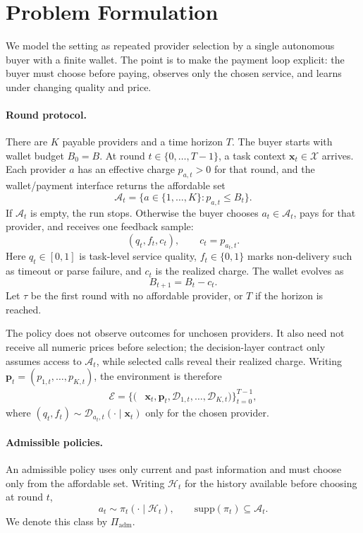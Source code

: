 \section{Problem Formulation}
\label{sec:problem}

We model the setting as repeated provider selection by a single autonomous buyer with a finite wallet. The point is to make the payment loop explicit: the buyer must choose before paying, observes only the chosen service, and learns under changing quality and price.

\paragraph{Round protocol.}
There are $K$ payable providers and a time horizon $T$. The buyer starts with wallet budget $B_0=B$. At round $t\in\{0,\ldots,T-1\}$, a task context $\mathbf{x}_t\in\mathcal{X}$ arrives. Each provider $a$ has an effective charge $p_{a,t}>0$ for that round, and the wallet/payment interface returns the affordable set
\begin{equation}
\label{eq:affordable-set}
\mathcal{A}_t=\{a\in\{1,\ldots,K\}:p_{a,t}\le B_t\}.
\end{equation}
If $\mathcal{A}_t$ is empty, the run stops. Otherwise the buyer chooses $a_t\in\mathcal{A}_t$, pays for that provider, and receives one feedback sample:
\[
(q_t,f_t,c_t),\qquad c_t=p_{a_t,t}.
\]
Here $q_t\in[0,1]$ is task-level service quality, $f_t\in\{0,1\}$ marks non-delivery such as timeout or parse failure, and $c_t$ is the realized charge. The wallet evolves as
\begin{equation}
\label{eq:wallet}
B_{t+1}=B_t-c_t .
\end{equation}
Let $\tau$ be the first round with no affordable provider, or $T$ if the horizon is reached.

The policy does not observe outcomes for unchosen providers. It also need not receive all numeric prices before selection; the decision-layer contract only assumes access to $\mathcal{A}_t$, while selected calls reveal their realized charge. Writing $\mathbf{p}_t=(p_{1,t},\ldots,p_{K,t})$, the environment is therefore
\[
\begin{aligned}
\mathcal{E}=\{(&\mathbf{x}_t,\mathbf{p}_t,
\mathcal{D}_{1,t},\ldots,\mathcal{D}_{K,t})\}_{t=0}^{T-1},
\end{aligned}
\]
where $(q_t,f_t)\sim\mathcal{D}_{a_t,t}(\cdot\mid\mathbf{x}_t)$ only for the chosen provider.

\paragraph{Admissible policies.}
An admissible policy uses only current and past information and must choose only from the affordable set. Writing $\mathcal{H}_t$ for the history available before choosing at round $t$,
\[
a_t\sim\pi_t(\cdot\mid\mathcal{H}_t),\qquad
\mathrm{supp}(\pi_t)\subseteq\mathcal{A}_t .
\]
We denote this class by $\Pi_{\mathrm{adm}}$.

